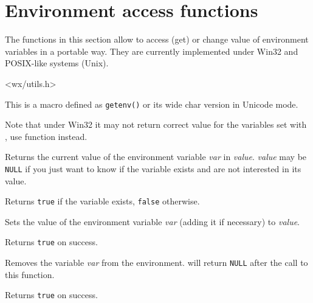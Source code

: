 \section{Environment access functions}\label{environfunctions}

The functions in this section allow to access (get) or change value of
environment variables in a portable way. They are currently implemented under
Win32 and POSIX-like systems (Unix).



<wx/utils.h>


\label{wxgetenvmacro}


This is a macro defined as {\tt getenv()} or its wide char version in Unicode
mode.

Note that under Win32 it may not return correct value for the variables set
with , use  function
instead.


\label{wxgetenv}


Returns the current value of the environment variable {\it var} in {\it value}.
{\it value} may be {\tt NULL} if you just want to know if the variable exists
and are not interested in its value.

Returns {\tt true} if the variable exists, {\tt false} otherwise.


\label{wxsetenv}


Sets the value of the environment variable {\it var} (adding it if necessary)
to {\it value}.

Returns {\tt true} on success.


\label{wxunsetenv}


Removes the variable {\it var} from the environment.
 will return {\tt NULL} after the call to this
function.

Returns {\tt true} on success.

